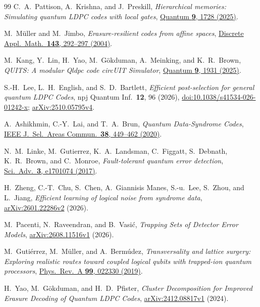 \documentclass[10pt,twocolumn]{article}
\theoremstyle{definition}
\begin{document}
\begin{thebibliography}{99}
C.~A.~Pattison, A.~Krishna, and J.~Preskill,
\emph{Hierarchical memories: Simulating quantum LDPC codes with local gates},
\href{https://doi.org/10.22331/q-2025-05-05-1728}{Quantum \textbf{9}, 1728 (2025)}.

M.~M\"uller and M.~Jimbo, \emph{Erasure-resilient codes from affine spaces},
\href{https://doi.org/10.1016/j.dam.2004.02.005}{Discrete Appl.\ Math.\ \textbf{143}, 292--297 (2004)}.

M.~Kang, Y.~Lin, H.~Yao, M.~G\"okduman, A.~Meinking, and K.~R.~Brown,
\emph{QUITS: A modular Qldpc code circUIT Simulator},
\href{https://doi.org/10.22331/q-2025-12-05-1931}{Quantum \textbf{9}, 1931 (2025)}.

S.-H.~Lee, L.~H.~English, and S.~D.~Bartlett,
\emph{Efficient post-selection for general quantum LDPC Codes},
npj Quantum Inf.\ \textbf{12}, 96 (2026),
\href{https://doi.org/10.1038/s41534-026-01242-x}{doi:10.1038/s41534-026-01242-x};
\href{https://arxiv.org/abs/2510.05795v4}{arXiv:2510.05795v4}.

A.~Ashikhmin, C.-Y.~Lai, and T.~A.~Brun, \emph{Quantum Data-Syndrome Codes},
\href{https://doi.org/10.1109/JSAC.2020.2968997}{IEEE J.\ Sel.\ Areas Commun.\ \textbf{38}, 449--462 (2020)}.

N.~M.~Linke, M.~Gutierrez, K.~A.~Landsman, C.~Figgatt, S.~Debnath, K.~R.~Brown, and C.~Monroe,
\emph{Fault-tolerant quantum error detection},
\href{https://doi.org/10.1126/sciadv.1701074}{Sci.\ Adv.\ \textbf{3}, e1701074 (2017)}.

H.~Zheng, C.-T.~Chu, S.~Chen, A.~Giannisis Manes, S.-u.~Lee,
S.~Zhou, and L.~Jiang,
\emph{Efficient learning of logical noise from syndrome data},
\href{https://arxiv.org/abs/2601.22286v2}{arXiv:2601.22286v2} (2026).

M.~Pacenti, N.~Raveendran, and B.~Vasi\'c,
\emph{Trapping Sets of Detector Error Models},
\href{https://arxiv.org/abs/2608.11516v1}{arXiv:2608.11516v1} (2026).

M.~Guti\'errez, M.~M\"uller, and A.~Berm\'udez,
\emph{Transversality and lattice surgery: Exploring realistic routes toward coupled logical qubits with trapped-ion quantum processors},
\href{https://doi.org/10.1103/PhysRevA.99.022330}{Phys.\ Rev.\ A \textbf{99}, 022330 (2019)}.

H.~Yao, M.~G\"okduman, and H.~D.~Pfister,
\emph{Cluster Decomposition for Improved Erasure Decoding of Quantum LDPC Codes},
\href{https://arxiv.org/abs/2412.08817v1}{arXiv:2412.08817v1} (2024).


\end{thebibliography}
\end{document}
